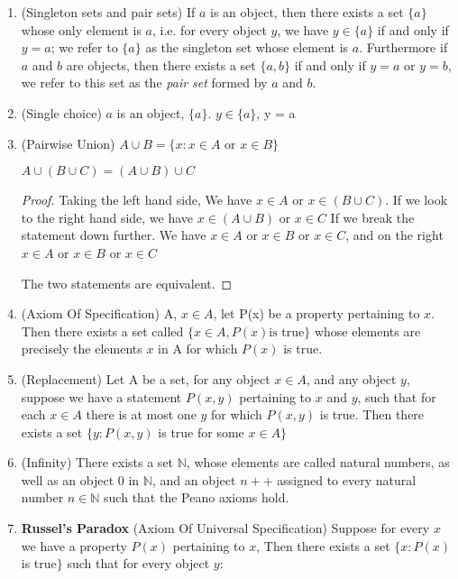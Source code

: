 \documentclass[11pt]{report}
\begin{document}
\begin{enumerate}
\begin{proof}
		      Thus we also prove that $\emptyset$ is unique.
	      \end{proof}
	      \break
	\item (Singleton sets and pair sets) If $a$ is an object, then there exists a set $\{a\}$ whose only element is $a$, i.e. for every object $y$, we have $y \in \{a\}$ if and only if $y=a$; we refer to $\{a\}$ as the singleton set whose element is $a$. Furthermore if $a$ and $b$ are objects, then there exists a set $\{a,b\}$ if and only if $y=a$ or $y=b$, we refer to this set as the \textit{pair set} formed by $a$ and $b$.
	\item (Single choice) $a$ is an object, $\{a\}$. $y \in \{a\}$, y = a
	\item (Pairwise Union) $A \cup B = \{x : x \in A \text{ or } x \in B\}$
	      \begin{lemma}
		      $A \cup (B \cup C) = (A \cup B) \cup C$
	      \end{lemma}
	      \begin{proof}
		      Taking the left hand side,
		      We have $x \in A$ or $x \in (B \cup C)$. If we look to the right hand side, we have $x \in (A \cup B)$ or $ x \in C$
		      If we break the statement down further.
		      We have $x \in A$ or $x \in B$ or $x \in C$, and  on the right $x \in A$ or $x \in B$ or $x\in C$

		      The two statements are equivalent.
	      \end{proof}
	\item (Axiom Of Specification) A, $x \in A$, let P(x) be a property pertaining to $x$. Then there exists a set called $\{x \in A, P(x) \text{is true}\}$ whose elements are precisely the elements $x$ in A for which $P(x)$ is true.
	\item (Replacement) Let A be a set, for any object $x \in A$, and any object $y$, suppose we have a statement $P(x,y)$ pertaining to $x$ and $y$, such that for each $x \in A$ there is at most one $y$ for which $P(x,y)$ is true. Then there exists a set $\{y : P(x,y)$ is true for some $x \in A\}$
	\item (Infinity) There exists a set $\mathbb{N}$, whose elements are called natural numbers, as well as an object $0$ in $\mathbb{N}$, and an object $n++$ assigned to every natural number $n \in \mathbb{N}$ such that the Peano axioms hold.

	\item \textbf{Russel's Paradox} (Axiom Of Universal Specification) Suppose for every $x$ we have a property $P(x)$ pertaining to $x$, Then there exists a set $\{x : P(x)$ is true$\}$ such that for every object $y$:


\end{enumerate}
\end{document}
